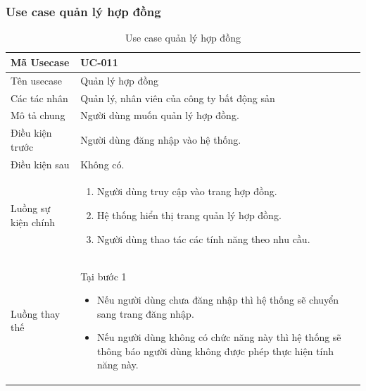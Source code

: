 \documentclass[12pt,a4paper]{article}
\begin{document}
    \subsubsection*{Use case quản lý hợp đồng}
    \begin{table}[H]
        \centering
        \begin{tabular}{|p{3.5cm}|p{11.5cm}|c|}
            \hline
            Mã Usecase      & UC-011                                      \\
            \hline
            Tên usecase     & Quản lý hợp đồng                            \\
            \hline
            Các tác nhân    & Quản lý, nhân viên của công ty bất động sản \\
            \hline
            Mô tả chung     & Người dùng muốn quản lý hợp đồng.           \\
            \hline

            Điều kiện trước & Người dùng đăng nhập vào hệ thống.          \\
            \hline

            Điều kiện sau   & Không có.                                   \\
            \hline

            Luồng sự kiện chính & \vspace{-.8cm}\begin{enumerate}
                                                    \item Người dùng truy cập vào trang hợp đồng.
                                                    \item Hệ thống hiển thị trang quản lý hợp đồng.
                                                    \item Người dùng thao tác các tính năng theo nhu cầu.
            \end{enumerate}
            \\
            \hline
            Luồng thay thế & Tại bước 1\newline
            \vspace{-.8cm}\begin{itemize}
                              \item Nếu người dùng chưa đăng nhập thì hệ thống sẽ chuyển sang trang đăng nhập.
                              \item Nếu người dùng không có chức năng này thì hệ thống sẽ thông báo người dùng không được phép thực hiện tính năng này.
            \end{itemize}

            \\ \hline
        \end{tabular}
        \caption{Use case quản lý hợp đồng}

    \end{table}
\end{document}
